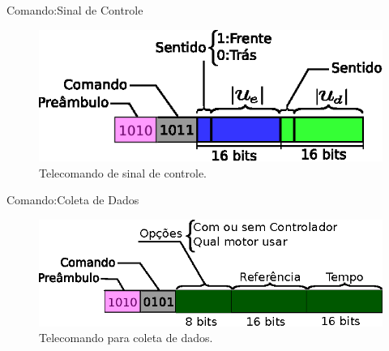 \begin{frame}{Comando:Sinal de Controle}
    \begin{figure}
        \centering
        \includegraphics[width=\textwidth]{figuras/ilustracoes/ilustracao_comando_sinal_de_controle.eps}
        \caption{Telecomando de sinal de controle.}
    \end{figure}
\end{frame}

\begin{frame}{Comando:Coleta de Dados}
    \begin{figure}
        \centering
        \includegraphics[width=\textwidth]{figuras/ilustracoes/ilustracao_comando_coleta_de_dados.eps}
        \caption{Telecomando para coleta de dados.}
    \end{figure}
\end{frame}